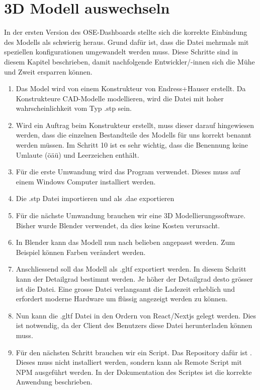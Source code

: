 \section{3D Modell auswechseln}
In der ersten Version des OSE-Dashboards stellte sich die korrekte Einbindung des Modells als schwierig heraus. Grund dafür ist, dass die Datei mehrmals mit speziellen konfigurationen umgewandelt werden muss. Diese Schritte sind in diesem Kapitel beschrieben, damit nachfolgende Entwickler/-innen sich die Mühe und Zweit ersparren können.
\begin{enumerate}
  \item Das Model wird von einem Konstrukteur von Endress+Hauser erstellt. Da Konstrukteure CAD-Modelle modellieren, wird die Datei mit hoher wahrscheinlichkeit vom Typ .stp sein.
  \item Wird ein Auftrag beim Konstrukteur erstellt, muss dieser darauf hingewiesen werden, dass die einzelnen Bestandteile des Modells für uns korrekt benannt werden müssen. Im Schritt 10 ist es sehr wichtig, dass die Benennung keine Umlaute (öäü) und Leerzeichen enthält.
  \item Für die erste Umwandung wird das Program  verwendet. Dieses muss auf einem Windows Computer installiert werden.
  \item Die .stp Datei importieren und als .dae exportieren
  \item Für die nächste Umwandung brauchen wir eine 3D Modellierungssoftware. Bisher wurde Blender verwendet, da dies keine Kosten verursacht.
  \item In Blender kann das Modell nun nach belieben angepasst werden. Zum Beispiel können Farben verändert werden.
  \item Anschliessend soll das Modell als .gltf exportiert werden. In diesem Schritt kann der Detailgrad bestimmt werden. Je höher der Detailgrad desto grösser ist die Datei. Eine grosse Datei verlangsamt die Ladezeit erheblich und erfordert moderne Hardware um flüssig angezeigt werden zu können.
  \item Nun kann die .gltf Datei in den  Ordern von React/Nextjs gelegt werden. Dies ist notwendig, da der Client des Benutzers diese Datei herunterladen können muss.
  \item Für den nächsten Schritt brauchen wir ein Script. Das Repository dafür ist \href{https://github.com/pmndrs/gltfjsx}{}. Dieses muss nicht installiert werden, sondern kann als Remote Script mit NPM ausgeführt werden. In der Dokumentation des Scriptes ist die korrekte Anwendung beschrieben.

\end{enumerate}
